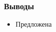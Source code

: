 \begin{frame}[t]
\frametitle{Выводы}
\begin{itemize}
    \item Предложена 
\end{itemize}
\end{frame}

